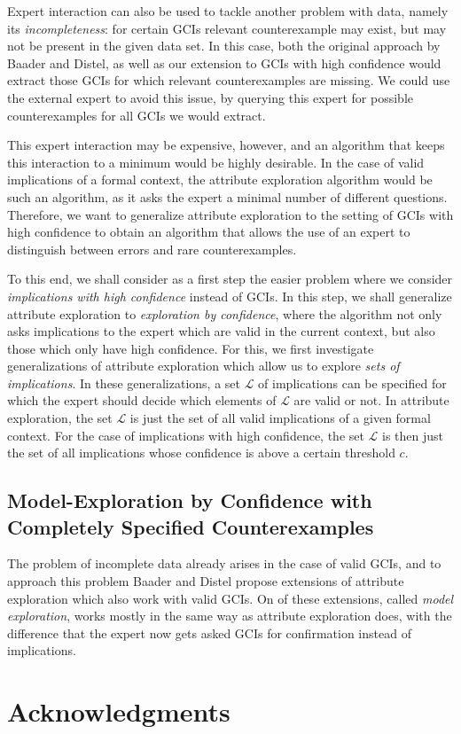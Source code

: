 Expert interaction can also be used to tackle another problem with data, namely its
\emph{incompleteness}: for certain GCIs relevant counterexample may exist, but may not be
present in the given data set.  In this case, both the original approach by Baader and
Distel, as well as our extension to GCIs with high confidence would extract those GCIs for
which relevant counterexamples are missing.  We could use the external expert to avoid
this issue, by querying this expert for possible counterexamples for all GCIs we would
extract.

This expert interaction may be expensive, however, and an algorithm that keeps this
interaction to a minimum would be highly desirable.  In the case of valid implications of
a formal context, the attribute exploration algorithm would be such an algorithm, as it
asks the expert a minimal number of different questions.  Therefore, we want to generalize
attribute exploration to the setting of GCIs with high confidence to obtain an algorithm
that allows the use of an expert to distinguish between errors and rare counterexamples.

To this end, we shall consider as a first step the easier problem where we consider
\emph{implications with high confidence} instead of GCIs.  In this step, we shall
generalize attribute exploration to \emph{exploration by confidence}, where the algorithm
not only asks implications to the expert which are valid in the current context, but also
those which only have high confidence.  For this, we first investigate generalizations of
attribute exploration which allow us to explore \emph{sets of implications}.  In these
generalizations, a set $\mathcal{L}$ of implications can be specified for which the expert
should decide which elements of $\mathcal{L}$ are valid or not.  In attribute exploration,
the set $\mathcal{L}$ is just the set of all valid implications of a given formal context.
For the case of implications with high confidence, the set $\mathcal{L}$ is then just the
set of all implications whose confidence is above a certain threshold $c$.

\subsection{Model-Exploration by Confidence with Completely Specified Counterexamples}
\label{sec:model-expl-conf}

The problem of incomplete data already arises in the case of valid GCIs, and to approach
this problem Baader and Distel propose extensions of attribute exploration which also work
with valid GCIs.  On of these extensions, called \emph{model exploration}, works mostly
in the same way as attribute exploration does, with the difference that the expert now
gets asked GCIs for confirmation instead of implications.  

\section{Acknowledgments}
\label{sec:acknowledgements}



